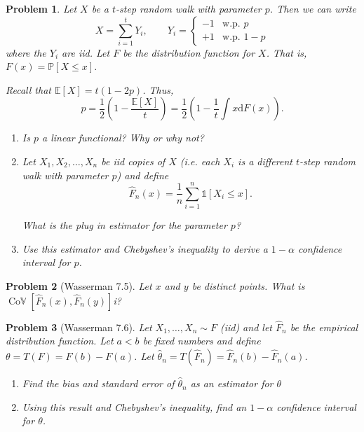 \documentclass{article}
\newtheorem{problem}{Problem}
\renewcommand{\d}{\mathrm{d}}
\newcommand{\PP}{\mathbb{P}}
\newcommand{\EE}{\mathbb{E}}
\newcommand{\CoV}{\operatorname{Co\mathbb{V}}}
\newcommand{\bOne}{\mathds{1}}
\begin{document}
\begin{problem}
Let $X$ be a $t$-step random walk with parameter $p$. Then we can write 
\begin{equation*}
    X = \sum_{i=1}^{t} Y_i
    ,\qquad
    Y_i = \begin{cases} -1 & \text{w.p. } p \\ +1 & \text{w.p. } 1-p \end{cases}
\end{equation*}
where the $Y_i$ are iid.
Let $F$ be the distribution function for $X$. That is, $F(x) = \PP[X\leq x]$.

Recall that $\EE[X] = t(1-2p)$.
Thus,
\begin{equation*}
    p 
    = \frac{1}{2} \left(1-\frac{\EE[X]}{t} \right)
    = \frac{1}{2} \left(1 - \frac{1}{t} \int x \d{F}(x) \right).
\end{equation*}

    \begin{enumerate}[label=(\alph*),topsep=0pt]

        \item Is $p$ a linear functional? Why or why not?
        \item Let $X_1, X_2, \ldots, X_n$ be iid copies of $X$ (i.e. each $X_i$ is a different $t$-step random walk with parameter $p$) and define
            \begin{equation*}
                \hat{F}_n(x) = \frac{1}{n} \sum_{i=1}^{n} \bOne[X_i \leq x].
            \end{equation*}

            What is the plug in estimator for the parameter $p$?
        \item Use this estimator and Chebyshev's inequality to derive a $1-\alpha$ confidence interval for $p$. 
    \end{enumerate}
\end{problem}

\begin{problem}[Wasserman 7.5]
    Let $x$ and $y$ be distinct points. What is $\CoV[\hat{F}_n(x), \hat{F}_n(y)]$i?
\end{problem}

\begin{problem}[Wasserman 7.6]
Let $X_1, \ldots, X_n \sim F$ (iid) and let $\hat{F}_n$ be the empirical distribution function.
Let $a<b$ be fixed numbers and define $\theta = T(F) = F(b) - F(a)$.
    Let $\hat{\theta}_n = T(\hat{F}_n) = \hat{F}_n(b) - \hat{F}_n(a)$.
    \begin{enumerate}[label=(\alph*),topsep=0pt]
        \item Find the bias and standard error of $\hat{\theta}_n$ as an estimator for $\theta$
        \item Using this result and Chebyshev's inequality, find an $1-\alpha$ confidence interval for $\theta$.
    \end{enumerate}
\end{problem}
\clearpage
\end{document}
